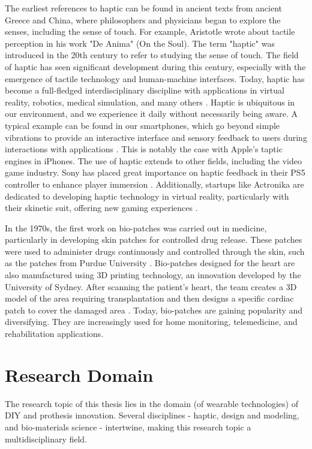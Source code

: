 The earliest references to haptic can be found in ancient texts from ancient Greece and China, where philosophers and physicians began to explore the senses, including the sense of touch. For example, Aristotle wrote about tactile perception in his work "De Anima" (On the Soul). The term "haptic" was introduced in the 20th century to refer to studying the sense of touch. The field of haptic has seen significant development during this century, especially with the emergence of tactile technology and human-machine interfaces. Today, haptic has become a full-fledged interdisciplinary discipline with applications in virtual reality, robotics, medical simulation, and many others \cite{noauthor_new_nodate}. Haptic is ubiquitous in our environment, and we experience it daily without necessarily being aware. A typical example can be found in our smartphones, which go beyond simple vibrations to provide an interactive interface and sensory feedback to users during interactions with applications \cite{interhaptics_haptics_2021}. This is notably the case with Apple's taptic engines in iPhones. The use of haptic extends to other fields, including the video game industry. Sony has placed great importance on haptic feedback in their PS5 controller to enhance player immersion \cite{noauthor_whats_nodate}. Additionally, startups like Actronika are dedicated to developing haptic technology in virtual reality, particularly with their skinetic suit, offering new gaming experiences \cite{noauthor_skinetic_nodate}.

In the 1970s, the first work on bio-patches was carried out in medicine, particularly in developing skin patches for controlled drug release. These patches were used to administer drugs continuously and controlled through the skin, such as the patches from Purdue University \cite{service_new_nodate}. Bio-patches designed for the heart are also manufactured using 3D printing technology, an innovation developed by the University of Sydney. After scanning the patient's heart, the team creates a 3D model of the area requiring transplantation and then designs a specific cardiac patch to cover the damaged area \cite{noauthor_mending_2020}. Today, bio-patches are gaining popularity and diversifying. They are increasingly used for home monitoring, telemedicine, and rehabilitation applications.

\section{Research Domain}
The research topic of this thesis lies in the domain (of wearable technologies) of DIY and prothesis innovation. Several disciplines - haptic, design and modeling, and bio-materials science - intertwine, making this research topic a multidisciplinary field.

